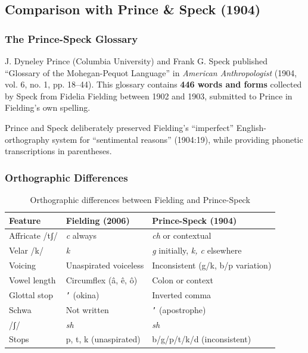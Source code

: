 \subsection{Comparison with Prince \& Speck (1904)}

\subsubsection{The Prince-Speck Glossary}

J. Dyneley Prince (Columbia University) and Frank G. Speck published
``Glossary of the Mohegan-Pequot Language'' in \emph{American Anthropologist}
(1904, vol. 6, no. 1, pp. 18--44). This glossary contains \textbf{446 words
and forms} collected by Speck from Fidelia Fielding between 1902 and 1903,
submitted to Prince in Fielding's own spelling.

Prince and Speck deliberately preserved Fielding's ``imperfect''
English-orthography system for ``sentimental reasons'' (1904:19), while
providing phonetic transcriptions in parentheses.

\subsubsection{Orthographic Differences}

\begin{table}[h]
\centering
\begin{tabular}{lll}
\toprule
Feature & Fielding (2006) & Prince-Speck (1904) \\
\midrule
Affricate /tʃ/ & \textit{c} always & \textit{ch} or contextual \\
Velar /k/ & \textit{k} & \textit{g} initially, \textit{k, c} elsewhere \\
Voicing & Unaspirated voiceless & Inconsistent (g/k, b/p variation) \\
Vowel length & Circumflex (â, ê, ô) & Colon or context \\
Glottal stop & \texttt{'} (okina) & Inverted comma \\
Schwa & Not written & \texttt{'} (apostrophe) \\
/ʃ/ & \textit{sh} & \textit{sh} \\
Stops & p, t, k (unaspirated) & b/g/p/t/k/d (inconsistent) \\
\bottomrule
\end{tabular}
\caption{Orthographic differences between Fielding and Prince-Speck}
\label{tab:1364-orth-diff}
\end{table}

